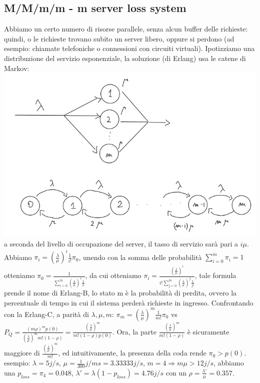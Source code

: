 \documentclass{article}
\begin{document}
\subsection{M/M/m/m - m server loss system}
Abbiamo un certo numero di risorse parallele, senza alcun buffer delle richieste: quindi, o le richieste trovano subito un server libero, oppure si perdono (ad esempio: chiamate telefoniche o connessioni con circuiti virtuali). Ipotizziamo una distribuzione del servizio esponenziale, la soluzione (di Erlang) usa le catene di Markov: \\
\includegraphics[scale=0.5]{images/PMCSN-2403-1.jpeg}\\ 
a seconda del livello di occupazione del server, il tasso di servizio sarà pari a $i \mu$. Abbiamo $\pi_i = (\frac{\lambda}{\mu})^i \frac{1}{i!}\pi_0$, unendo con la somma delle probabilità $\sum\limits_{i=0}^{m} \pi_i = 1$ otteniamo $\pi_0 = \frac{1}{\sum\limits_{i=0}^{m} (\frac{\lambda}{\mu})^i \frac{1}{i!}}$, da cui otteniamo $\pi_i = \frac{(\frac{\lambda}{\mu})^i}{i! \sum\limits_{j=0}^{m} (\frac{\lambda}{\mu})^j \frac{1}{j!}}$, tale formula prende il nome di Erlang-B, lo stato m è la probabilità di perdita, ovvero la percentuale di tempo in cui il sistema perderà richieste in ingresso. Confrontando con la Erlang-C, a parità di $\lambda, \mu, m$: $\pi_m = (\frac{\lambda}{\mu})^m \frac{1}{m!} \pi_0$ vs $P_Q = \frac{(m \rho)^m p(0)}{(\frac{\lambda}{\mu})^m m!(1 - \rho)} = \frac{(\frac{\lambda}{\mu})^m}{m!(1 - \rho)p(0)}$. Ora, la parte $\frac{(\frac{\lambda}{\mu})^m}{m!(1 - \rho)}$ è sicuramente maggiore di $\frac{(\frac{\lambda}{\mu})^m}{m!}$, ed intuitivamente, la presenza della coda rende $\pi_0 > p(0)$.\\ esempio: $\lambda = 5 j/s$, $\mu = \frac{1}{300} j/ms = 3.33333 j/s$, $m = 4 \Rightarrow m \mu > 12 j/s$, abbiamo una $p_{loss} = \pi_4 = 0.048$, $\lambda' = \lambda(1 - p_{loss}) = 4.76 j/s$ con un $\rho = \frac{\lambda'}{\mu} = 0.357$.
\end{document}
